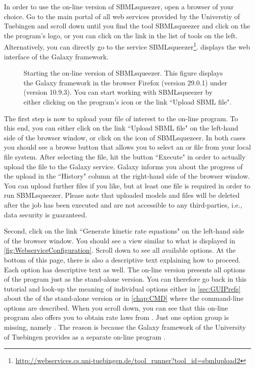 In order to use the on-line version of SBMLsqueezer, open a browser of your choice.
Go to the main portal of all web services provided by the Universtiy of Tuebingen
and scroll down until you find the tool SBMLsqueezer and click on the the program's logo, or you can click on the link in the list of tools on the left.
Alternatively, you can directly go to the service SBMLsqueezer\footnote{\url{http://webservices.cs.uni-tuebingen.de/tool_runner?tool_id=sbmlupload2}}.
 displays the web interface of the Galaxy framework.
\begin{figure}
\caption[Starting the on-line version of SBMLsqueezer]{Starting the on-line version of SBMLsqueezer.
This figure displays the Galaxy framework in the browser Firefox (version 29.0.1) under \MacOSX (version 10.9.3).
You can start working with SBMLsqueezer by either clicking on the program's icon or the link ``Upload SBML file".}
\label{fig:WebserviceLaunch}
\end{figure}

The first step is now to upload your \SBML file of interest to the on-line program.
To this end, you can either click on the link ``Upload SBML file" on the left-hand side of the browser window, or click on the icon of SBMLsquezeer.
In both cases you should see a browse button that allows you to select an \XML or \SBML file from your local file system.
After selecting the file, hit the button ``Execute" in order to actually upload the file to the Galaxy service.
Galaxy informs you about the progress of the upload in the ``History" column at the right-hand side of the browser window.
You can upload further files if you like, but at least one file is required in order to run SBMLsqueezer.
Please note that uploaded models and files will be deleted after the job has been executed and are not accessible to any third-parties, i.e., data security is guaranteed.

Second, click on the link ``Generate kinetic rate equations" on the left-hand side of the browser window.
You should see a view similar to what is displayed in \vref{fig:WebserviceConfiguration}.
Scroll down to see all available options.
At the bottom of this page, there is also a descriptive text explaining how to proceed.
Each option has descriptive text as well.
The on-line version presents all options of the program just as the stand-alone version.
You can therefore go back in this tutorial and look-up the meaning of individual options either in \vref{sec:GUIPrefs} about the \GUI of the stand-alone version or in \vref{chap:CMD} where the command-line options are described.
When you scroll down, you can see that this on-line program also offers you to obtain rate laws from \SABIO.
Just one option group is missing, namely \SBMLLaTeX.
The reason is because the Galaxy framework of the University of Tuebingen provides \SBMLLaTeX as a separate on-line program \citep{Draeger2009b}.

